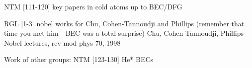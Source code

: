 	NTM [111-120] key papers in cold atoms up to BEC/DFG 

RGL [1-3] nobel works for Chu, Cohen-Tannoudji and Phillips (remember that time you met him - BEC was a total surprise) 
	Chu, Cohen-Tannoudji, Phillips - Nobel lectures, rev mod phys 70, 1998

		Work of other groups:
		NTM [123-130] He* BECs 
		
